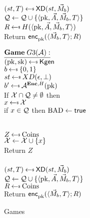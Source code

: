 \begin{figure}[tbhp]
\begin{center}
{\medskip
{}\\
$(st, T) \getsr \mdalg(st,\vmsg_b)$\\
$\mathcal{Q} \gets \mathcal{Q} \cup \{\langle \mathrm{pk},\vec{A},\vec{M}_b,T\rangle\}$\\
$R \getsr H(\langle \pk,\vad,\vmsg_b,\umd\rangle)$\\
Return ${\mathsf{enc}}_{\mathrm{pk}}^{}(\langle \vec{M}_b,T\rangle; R)$\\
}
{
$\gamev{G3}{\advA}$\\
 $(\pk,\sk)\getsr\Kgen$\\
$ b \getsr \bits$\\
 $st \getsr XD(\epsilon,\bot)$\\
 $b' \getsr \advA^{\encOracle,H}(\pk)$\\
 If $\mathcal{X} \cap \mathcal{Q} \neq \emptyset$ then \\
\nudge $ x \getsr \calX$\\
\nudge if $x \in \mathcal{Q}$ then $\mathrm{BAD}\gets\textsf{true}$

\medskip
{}\\
  $Z \getsr \mathrm{Coins}$\\
  $\mathcal{X} \gets \mathcal{X} \cup \{x\}$\\
  Return $Z$\\

\medskip
{}\\
$(st, T) \getsr \mdalg(st,\vmsg_b)$\\
$\mathcal{Q} \gets \mathcal{Q} \cup \{\langle \mathrm{pk},\vec{A},\vec{M}_b,T\rangle\}$\\
$R \getsr \mathrm{Coins}$\\
Return ${\mathsf{enc}}_{\mathrm{pk}}^{}(\langle \vec{M}_b,T\rangle; R)$\\
}
\caption{Games}
\label{fig:CPA}
\end{center}
\end{figure}

